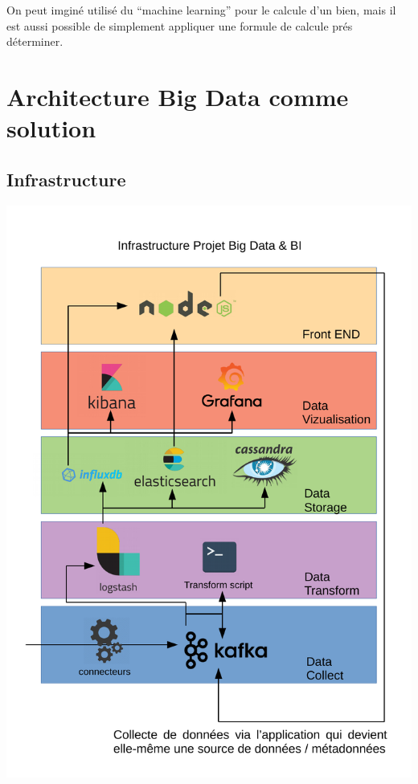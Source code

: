 \documentclass[12pt]{report}
\begin{document}
On peut imginé utilisé du ``machine learning'' pour le calcule d'un bien, mais
il est aussi possible de simplement appliquer une formule de calcule prés
déterminer.

\chapter{Architecture Big Data comme solution}
\goodbreak

\section{Infrastructure}
\includegraphics[width=16cm]{pdfinc/SchemaInfra.pdf}

\goodbreak
\end{document}
